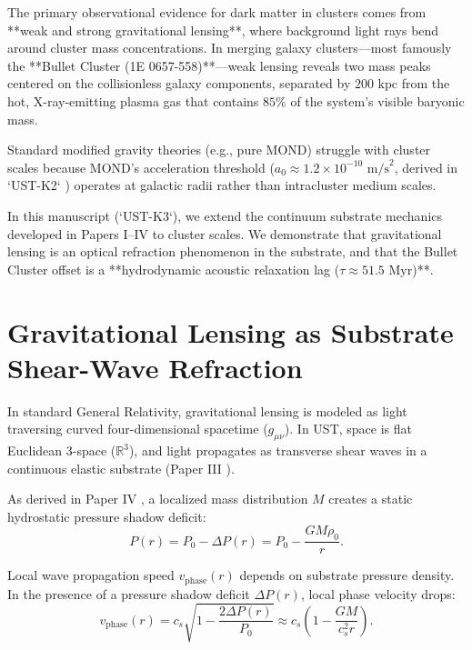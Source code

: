 \documentclass[11pt,a4paper]{article}
\begin{document}
	The primary observational evidence for dark matter in clusters comes from **weak and strong gravitational lensing**, where background light rays bend around cluster mass concentrations. In merging galaxy clusters—most famously the **Bullet Cluster (1E 0657-558)**—weak lensing reveals two mass peaks centered on the collisionless galaxy components, separated by $200 \text{ kpc}$ from the hot, X-ray-emitting plasma gas that contains $85\%$ of the system's visible baryonic mass.
	
	Standard modified gravity theories (e.g., pure MOND) struggle with cluster scales because MOND's acceleration threshold ($a_0 \approx 1.2 \times 10^{-10} \text{ m/s}^2$, derived in `UST-K2` \cite{USTK2}) operates at galactic radii rather than intracluster medium scales.
	
	In this manuscript (`UST-K3`), we extend the continuum substrate mechanics developed in Papers I--IV \cite{PaperI, PaperII, PaperIII, PaperIV} to cluster scales. We demonstrate that gravitational lensing is an optical refraction phenomenon in the substrate, and that the Bullet Cluster offset is a **hydrodynamic acoustic relaxation lag ($\tau \approx 51.5 \text{ Myr}$)**.
	
	\section{Gravitational Lensing as Substrate Shear-Wave Refraction}
	\label{sec:lensing_mechanics}
	
	In standard General Relativity, gravitational lensing is modeled as light traversing curved four-dimensional spacetime ($g_{\mu\nu}$). In UST, space is flat Euclidean 3-space ($\mathbb{R}^3$), and light propagates as transverse shear waves in a continuous elastic substrate (Paper III \cite{PaperIII}).
	
	As derived in Paper IV \cite{PaperIV}, a localized mass distribution $M$ creates a static hydrostatic pressure shadow deficit:
	\begin{equation}
		P(r) = P_0 - \Delta P(r) = P_0 - \frac{G M \rho_0}{r}.
		\label{eq:pressure_shadow_deficit}
	\end{equation}
	
	Local wave propagation speed $v_{\text{phase}}(r)$ depends on substrate pressure density. In the presence of a pressure shadow deficit $\Delta P(r)$, local phase velocity drops:
	\begin{equation}
		v_{\text{phase}}(r) = c_s \sqrt{1 - \frac{2 \Delta P(r)}{P_0}} \approx c_s \left( 1 - \frac{G M}{c_s^2 r} \right).
		\label{eq:shear_wave_velocity_refraction}
	\end{equation}
	
\end{document}
